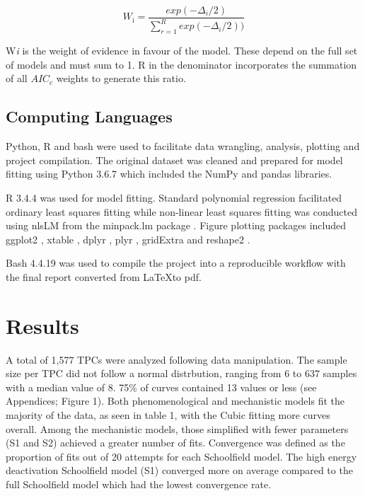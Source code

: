 \documentclass[11pt]{article}
\begin{document}
\begin{linenumbers}
\begin{equation}
W_{\text{i}} = \frac{exp(-\Delta_i/2)}{\sum_{r = 1}^{R} exp(-\Delta_i/2))}\tag{9}
\end{equation}

W\textit{i} is the weight of evidence in favour of the model. These depend on the full set of models and must sum to 1. R in the denominator incorporates the summation of all \(AIC_c\) weights to generate this ratio.

\subsection{Computing Languages}
Python, R and bash were used to facilitate data wrangling, analysis, plotting and project compilation. The original dataset was cleaned and prepared for model fitting using Python 3.6.7 which included the NumPy \cite{numpy} and pandas \cite{Mckinney2011} libraries.

R 3.4.4 \cite{R} was used for model fitting. Standard polynomial regression facilitated ordinary least squares fitting while non-linear least squares fitting was conducted using nlsLM from the minpack.lm package \cite{minpack}. Figure plotting packages included ggplot2 \cite{ggplot2}, xtable \cite{xtable}, dplyr \cite{dplyr}, plyr \cite{plyr}, gridExtra \cite{gridextra} and reshape2 \cite{reshape2}.

Bash 4.4.19 was used to compile the project into a reproducible workflow with the final report converted from \LaTeX to pdf.

 

\section{Results}
A total of 1,577 TPCs were analyzed following data manipulation. The sample size per TPC did not follow a normal distrbution, ranging from 6 to 637 samples with a median value of 8. 75\% of curves contained 13 values or less (see Appendices; Figure 1). Both phenomenological and mechanistic models fit the majority of the data, as seen in table 1, with the Cubic fitting more curves overall. Among the mechanistic models, those simplified with fewer parameters (S1 and S2) achieved a greater number of fits. Convergence was defined as the proportion of fits out of 20 attempts for each Schoolfield model. The high energy deactivation Schoolfield model (S1) converged more on average compared to the full Schoolfield model which had the lowest convergence rate.\\


\end{linenumbers}
\end{document}
